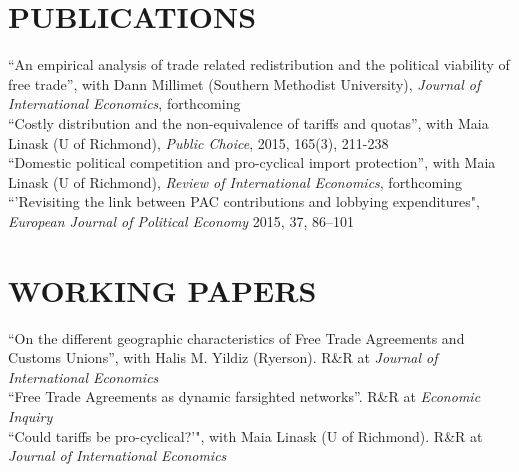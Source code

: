 \documentclass[11pt]{res}
\begin{document}
\begin{resume}
\section{PUBLICATIONS}\vspace{1.5mm}
{``An empirical analysis of trade related redistribution and the political viability of free trade''}, with Dann Millimet (Southern Methodist University), \emph{Journal of International Economics}, forthcoming \vspace{1.5mm}\\
{``Costly distribution and the non-equivalence of tariffs and quotas''}, with Maia Linask (U of Richmond), \emph{Public Choice}, 2015, 165(3), 211-238 \vspace{1.5mm}\\
{``Domestic political competition and pro-cyclical import protection''}, with Maia Linask (U of Richmond), \emph{Review of International Economics}, forthcoming\vspace{1.5mm}\\
{``'Revisiting the link between PAC contributions and lobbying expenditures", \emph{European Journal of Political Economy}} 2015, 37, 86--101 \vspace{1.5mm}\\

\section{WORKING PAPERS}\vspace{1.5mm}
{``On the different geographic characteristics of Free Trade Agreements and Customs Unions''}, with Halis M. Yildiz (Ryerson). R\&R at \emph{Journal of International Economics}\vspace{1.5mm}\\
{ ``Free Trade Agreements as dynamic farsighted networks''}. R\&R at \emph{Economic Inquiry} \vspace{1.5mm}\\
{``Could tariffs be pro-cyclical?'"}, with Maia Linask (U of Richmond). R\&R at \emph{Journal of International Economics}\vspace{1.5mm}\\



\end{resume}
\end{document}
